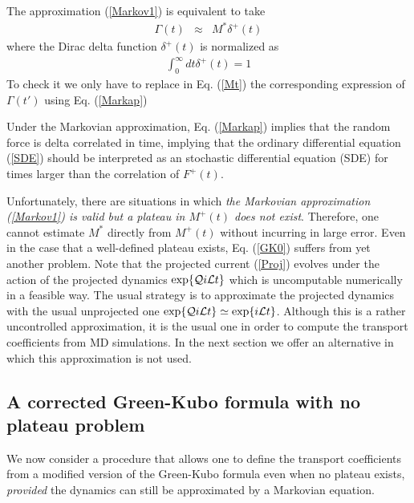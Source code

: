 \documentclass[b5paper,openright,11pt]{book}
\begin{document}
The   approximation
(\ref{Markov1}) is equivalent to take
\begin{eqnarray}
  \Gamma(t) &\approx& M^*\delta^+(t)
\label{Markap}
\end{eqnarray}
where   the Dirac delta function
$\delta^+(t)$ is normalized as
\begin{align}
  \int_0^\infty dt \delta^+(t) =1
\end{align}
To check it we only have to replace in Eq. (\ref{Mt}) the corresponding expression of $\Gamma(t')$ using Eq. (\ref{Markap})

Under the  Markovian approximation,  Eq.  (\ref{Markap})  implies that
the  random force  is  delta  correlated in  time,  implying that  the
ordinary differential equation (\ref{SDE}) should be interpreted as an
stochastic  differential  equation (SDE)  for  times  larger than  the
correlation of $F^+(t)$.


Unfortunately,  there are  situations  in  which \textit{the  Markovian
approximation (\ref{Markov1}) is valid but  a plateau in $M^+(t)$ does
not  exist}.  Therefore,  one  cannot estimate  $M^*$ directly  from
$M^+(t)$ without  incurring in  large error.   Even in  the case  that a
well-defined plateau exists, Eq.  (\ref{GK0}) suffers from yet another
problem.  Note  that the projected current  (\ref{Proj}) evolves under
the  action of  the  projected dynamics  $\exp\{{\cal Q}i{\cal  L}t\}$
which  is  uncomputable numerically  in  a  feasible way.   The  usual
strategy  is to  approximate  the projected  dynamics  with the  usual
unprojected one $\exp\{{\cal Q}i{\cal L}t\}\simeq \exp\{i{\cal L}t\}$.
Although this is a rather  uncontrolled approximation, it is the usual
one  in   order  to  compute   the  transport  coefficients   from  MD
simulations. In the next section we offer an alternative in which this approximation
is not used.



\subsection{A corrected Green-Kubo formula with no plateau problem}
\label{Sec:CorrectedGK}
We now  consider a procedure that  allows one to define  the transport
coefficients from  a modified version  of the Green-Kubo  formula even
when no  plateau exists, \textit{provided}  the dynamics can  still be
approximated by a Markovian equation.
\end{document}
